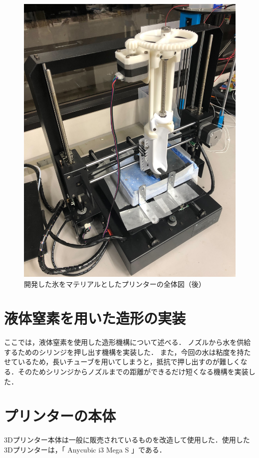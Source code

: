 \begin{figure}[H]
  \centering
  \includegraphics[width=7truecm]{./fig/printer2.jpg}
  \caption{開発した氷をマテリアルとしたプリンターの全体図（後）}
  \label{fig:printer2}
\end{figure}



\section{液体窒素を用いた造形の実装}
\label{sec:paragraph}
ここでは，液体窒素を使用した造形機構について述べる．
ノズルから水を供給するためのシリンジを押し出す機構を実装した．
また，今回の水は粘度を持たせているため，長いチューブを用いてしまうと，抵抗で押し出すのが難しくなる．そのためシリンジからノズルまでの距離ができるだけ短くなる機構を実装した．

\section{プリンターの本体}
\label{sec:paragraph}
3Dプリンター本体は一般に販売されているものを改造して使用した．使用した3Dプリンターは，「 Anycubic i3 Mega S 」である．

